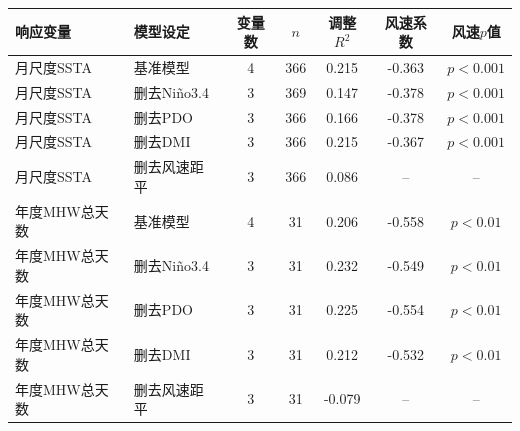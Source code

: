 \begin{tabular}{llccccc}
\hline
响应变量 & 模型设定 & 变量数 & $n$ & 调整$R^2$ & 风速系数 & 风速$p$值 \\
\hline
月尺度SSTA & 基准模型 & 4 & 366 & 0.215 & -0.363 & $p<0.001$ \\
月尺度SSTA & 删去Niño3.4 & 3 & 369 & 0.147 & -0.378 & $p<0.001$ \\
月尺度SSTA & 删去PDO & 3 & 366 & 0.166 & -0.378 & $p<0.001$ \\
月尺度SSTA & 删去DMI & 3 & 366 & 0.215 & -0.367 & $p<0.001$ \\
月尺度SSTA & 删去风速距平 & 3 & 366 & 0.086 & -- & -- \\
年度MHW总天数 & 基准模型 & 4 & 31 & 0.206 & -0.558 & $p<0.01$ \\
年度MHW总天数 & 删去Niño3.4 & 3 & 31 & 0.232 & -0.549 & $p<0.01$ \\
年度MHW总天数 & 删去PDO & 3 & 31 & 0.225 & -0.554 & $p<0.01$ \\
年度MHW总天数 & 删去DMI & 3 & 31 & 0.212 & -0.532 & $p<0.01$ \\
年度MHW总天数 & 删去风速距平 & 3 & 31 & -0.079 & -- & -- \\
\hline
\end{tabular}

